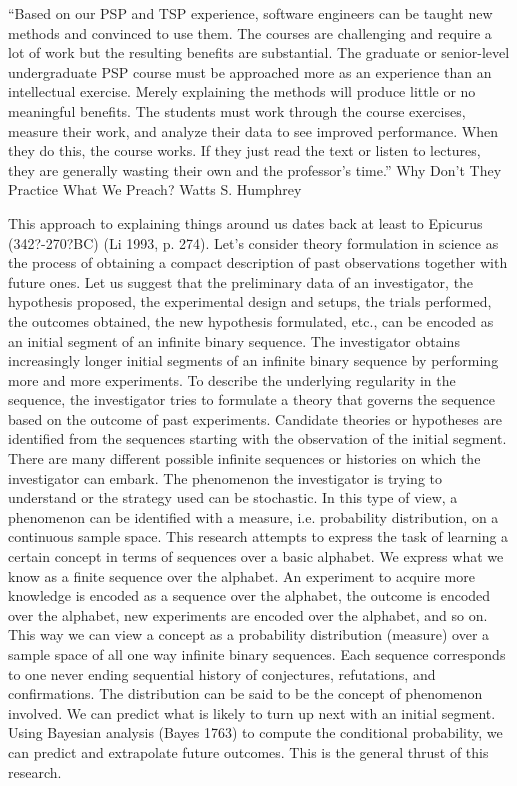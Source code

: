 ``Based on our PSP and TSP experience, software engineers can be taught new methods and
convinced to use them. The courses are challenging and require a lot of work but the 
resulting benefits are substantial. The graduate or senior-level undergraduate PSP 
course must be approached more as an experience than an intellectual exercise. 
Merely explaining the methods will produce little or no meaningful benefits. 
The students must work through the course exercises, measure their work, and 
analyze their data to see improved performance. When they do this, the course works. 
If they just read the text or listen to lectures, they are generally wasting their 
own and the professor's time.''
Why Don't They Practice What We Preach?
Watts S. Humphrey

This approach to explaining things around us dates back at least to Epicurus
(342?-270?BC) (Li 1993, p. 274). Let’s consider theory formulation in science as the
process of obtaining a compact description of past observations together with future ones.
Let us suggest that the preliminary data of an investigator, the hypothesis proposed, the
experimental design and setups, the trials performed, the outcomes obtained, the new
hypothesis formulated, etc., can be encoded as an initial segment of an infinite binary
sequence. The investigator obtains increasingly longer initial segments of an infinite
binary sequence by performing more and more experiments. To describe the underlying
regularity in the sequence, the investigator tries to formulate a theory that governs the
sequence based on the outcome of past experiments. Candidate theories or hypotheses
are identified from the sequences starting with the observation of the initial segment.
There are many different possible infinite sequences or histories on which the
investigator can embark. The phenomenon the investigator is trying to understand or the
strategy used can be stochastic. In this type of view, a phenomenon can be identified
with a measure, i.e. probability distribution, on a continuous sample space.
This research attempts to express the task of learning a certain concept in terms of
sequences over a basic alphabet. We express what we know as a finite sequence over the
alphabet. An experiment to acquire more knowledge is encoded as a sequence over the
alphabet, the outcome is encoded over the alphabet, new experiments are encoded over
the alphabet, and so on. This way we can view a concept as a probability distribution
(measure) over a sample space of all one way infinite binary sequences. Each sequence
corresponds to one never ending sequential history of conjectures, refutations, and
confirmations. The distribution can be said to be the concept of phenomenon involved.
We can predict what is likely to turn up next with an initial segment. Using Bayesian
analysis (Bayes 1763) to compute the conditional probability, we can predict and
extrapolate future outcomes. This is the general thrust of this research.

